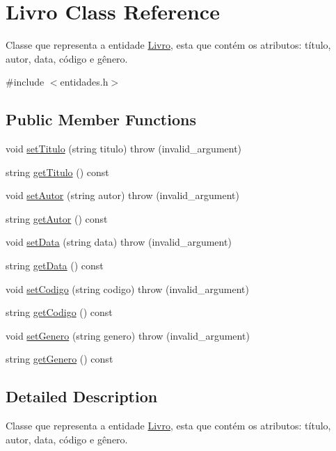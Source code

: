 \hypertarget{classLivro}{}\section{Livro Class Reference}
\label{classLivro}


Classe que representa a entidade \hyperlink{classLivro}{Livro}, esta que contém os atributos\+: título, autor, data, código e gênero.  




{\ttfamily \#include $<$entidades.\+h$>$}

\subsection*{Public Member Functions}
\begin{DoxyCompactItemize}
\item 
void \hyperlink{classLivro_adbae26ce6938e1f56ed6d88b458351c7}{set\+Titulo} (string titulo)  throw (invalid\+\_\+argument)
\item 
string \hyperlink{classLivro_a4b4e2e74d4fa1a0e6e9a4d6c05dc3bd4}{get\+Titulo} () const
\item 
void \hyperlink{classLivro_ab6979584fef48cc9b2ca4dc0359dd69d}{set\+Autor} (string autor)  throw (invalid\+\_\+argument)
\item 
string \hyperlink{classLivro_ae8f2ea7e82a3ddd33e1d0e242c43f3e5}{get\+Autor} () const
\item 
void \hyperlink{classLivro_a073f7124564707c5c36e9a44448aa13a}{set\+Data} (string data)  throw (invalid\+\_\+argument)
\item 
string \hyperlink{classLivro_aaf7d614049f22c09631bae2a5f83c16a}{get\+Data} () const
\item 
void \hyperlink{classLivro_a814d21b9fc0e35f974fcd7739082ea58}{set\+Codigo} (string codigo)  throw (invalid\+\_\+argument)
\item 
string \hyperlink{classLivro_ac0bf6014dae1a0a3cb15ffac8b886f13}{get\+Codigo} () const
\item 
void \hyperlink{classLivro_a642383a02f6a1dac3f69de8ac80184e7}{set\+Genero} (string genero)  throw (invalid\+\_\+argument)
\item 
string \hyperlink{classLivro_a00b6085b059571efab6d29630cf95a50}{get\+Genero} () const
\end{DoxyCompactItemize}


\subsection{Detailed Description}
Classe que representa a entidade \hyperlink{classLivro}{Livro}, esta que contém os atributos\+: título, autor, data, código e gênero. 

